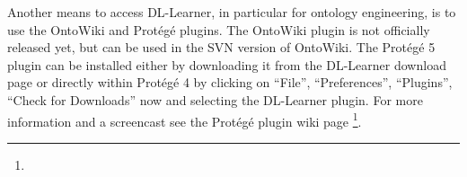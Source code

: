 \documentclass[a4paper,12pt]{scrartcl}
\begin{document}




Another means to access DL-Learner, in particular for ontology engineering, is to use the OntoWiki and Protégé plugins. The OntoWiki plugin is not officially released yet, but can be used in the SVN version of OntoWiki. The Protégé 5 plugin can be installed either by downloading it from the DL-Learner download page or directly within Protégé 4 by clicking on ``File'', ``Preferences'', ``Plugins'', ``Check for Downloads'' now and selecting the DL-Learner plugin. For more information and a screencast see the Protégé plugin wiki page \footnote{\wikiprotplugin}.
\end{document}
